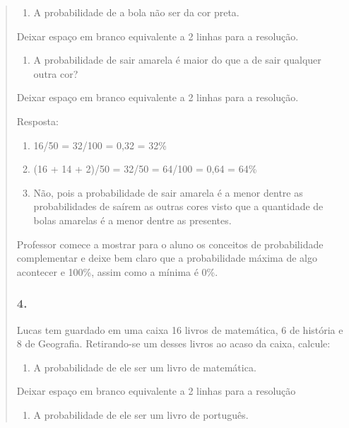 \begin{enumerate}
\begin{escolha}
\begin{enumerate}
\begin{itemize}
\begin{itemize}
\begin{escolha}
\begin{quote}
\begin{escolha}
\begin{enumerate}
\def\labelenumi{\alph{enumi})}
\item
  A probabilidade de a bola não ser da cor preta.
\end{enumerate}

Deixar espaço em branco equivalente a 2 linhas para a resolução.

\begin{enumerate}
\def\labelenumi{\alph{enumi})}
\item
  A probabilidade de sair amarela é maior do que a de sair qualquer
  outra cor?
\end{enumerate}

Deixar espaço em branco equivalente a 2 linhas para a resolução.

Resposta:

\begin{enumerate}
\def\labelenumi{\alph{enumi})}
\item
  16/50 = 32/100 = 0,32 = 32\%
\item
  (16 + 14 + 2)/50 = 32/50 = 64/100 = 0,64 = 64\%
\item
  Não, pois a probabilidade de sair amarela é a menor dentre as
  probabilidades de saírem as outras cores visto que a quantidade de
  bolas amarelas é a menor dentre as presentes.
\end{enumerate}

Professor comece a mostrar para o aluno os conceitos de probabilidade
complementar e deixe bem claro que a probabilidade máxima de algo
acontecer e 100\%, assim como a mínima é 0\%.

\subsubsection{4.}\label{section-81}

Lucas tem guardado em uma caixa 16 livros de matemática, 6 de história e
8 de Geografia. Retirando-se um desses livros ao acaso da caixa,
calcule:

\begin{enumerate}
\def\labelenumi{\alph{enumi})}
\item
  A probabilidade de ele ser um livro de matemática.
\end{enumerate}

Deixar espaço em branco equivalente a 2 linhas para a resolução

\begin{enumerate}
\def\labelenumi{\alph{enumi})}
\item
  A probabilidade de ele ser um livro de português.
\end{enumerate}


\end{escolha}
\end{quote}
\end{escolha}
\end{itemize}
\end{itemize}
\end{enumerate}
\end{escolha}
\end{enumerate}
